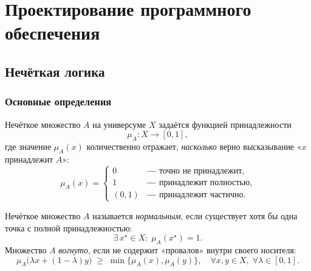 \section{Проектирование программного обеспечения}


\subsection{Нечёткая логика}
\subsubsection{Основные определения}

\begin{definition}
Нечёткое множество $A$ на универсуме $X$ задаётся функцией принадлежности
\begin{equation}
  \mu_A\colon X \longrightarrow [0,1],
  \label{eq:fuzzy_set_def}
\end{equation}
где значение $\mu_A(x)$ количественно отражает,
\emph{насколько} верно высказывание «$x$ принадлежит $A$»:
\[
  \mu_A(x)=
  \begin{cases}
    0          &\text{― точно не принадлежит},\\
    1          &\text{― принадлежит полностью},\\
    (0,1)      &\text{― принадлежит частично}.
  \end{cases}
\]
\end{definition}

\begin{definition}
Нечёткое множество $A$ называется
\emph{нормальным}, если существует хотя бы одна точка
с полной принадлежностью:
\begin{equation}
  \exists\,x^\star\in X:\; \mu_A(x^\star)=1.
\end{equation}
Множество $A$ \emph{вогнуто}, если не содержит «провалов» внутри
своего носителя:
\begin{equation}
  \mu_A\!\bigl(\lambda x+(1-\lambda)y\bigr)\;\ge\;
  \min\{\mu_A(x),\mu_A(y)\},
  \quad \forall x,y\in X,\;\forall\lambda\in[0,1].
\end{equation}
\end{definition}


